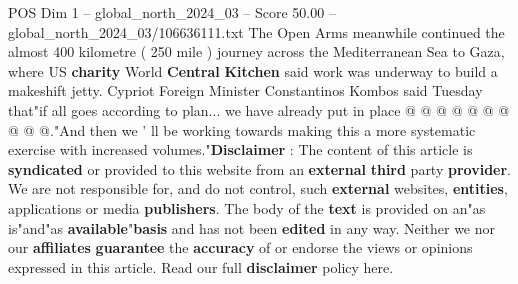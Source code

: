 \begin{textsample}{POS Dim 1 – global\_north\_2024\_03 – Score 50.00 – global\_north\_2024\_03/106636111.txt}
The Open Arms meanwhile continued the almost 400 kilometre ( 250 mile ) journey across the Mediterranean Sea to Gaza, where US \textbf{charity} World \textbf{Central} \textbf{Kitchen} said work was underway to build a makeshift jetty.
Cypriot Foreign Minister Constantinos Kombos said Tuesday that"if all goes according to plan... we have already put in place @ @ @ @ @ @ @ @ @ @."And then we ' ll be working towards making this a more systematic exercise with increased volumes."\textbf{Disclaimer} : The content of this article is \textbf{syndicated} or provided to this website from an \textbf{external} \textbf{third} party \textbf{provider}.
We are not responsible for, and do not control, such \textbf{external} websites, \textbf{entities}, applications or media \textbf{publishers}.
The body of the \textbf{text} is provided on an"as is"and"as \textbf{available}"\textbf{basis} and has not been \textbf{edited} in any way.
Neither we nor our \textbf{affiliates} \textbf{guarantee} the \textbf{accuracy} of or endorse the views or opinions expressed in this article.
Read our full \textbf{disclaimer} policy here.

\end{textsample}
